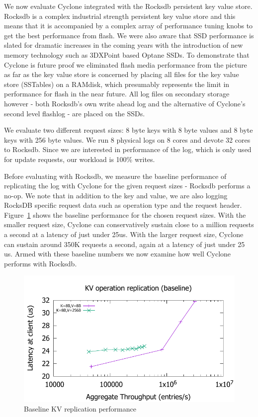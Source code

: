 \documentclass[pageno]{jpaper}
\begin{document}
We now evaluate Cyclone integrated with the Rocksdb persistent key value
store. Rocksdb is a complex industrial strength persistent key value store and
this means that it is accompanied by a complex array of performance tuning knobs
to get the best performance from flash. We were also aware that SSD performance
is slated for dramatic increases in the coming years with the introduction of
new memory technology such as 3DXPoint based Optane SSDs. To demonstrate that
Cyclone is future proof we eliminated flash media performance from the picture
as far as the key value store is concerned by placing all files for the key
value store (SSTables) on a RAMdisk, which presumably represents the limit in
performance for flash in the near future. All log files on secondary storage
however - both Rocksdb's own write ahead log and the alternative of Cyclone's
second level flashlog - are placed on the SSDs.

We evaluate two different request sizes: 8 byte keys with 8 byte values and 8
byte keys with 256 byte values. We run 8 physical logs on 8 cores and devote 32
cores to Rocksdb. Since we are interested in performance of the log, which is
only used for update requests, our workload is 100\% writes.

Before evaluating with Rocksdb, we measure the baseline performance of
replicating the log with Cyclone for the given request sizes - Rocksdb performs
a no-op. We note that in addition to the key and value, we are also logging
RocksDB specific request data such as operation type and the request header.
Figure~\ref{fig:kv_baseline} shows the baseline performance for the chosen
request sizes. With the smaller request size, Cyclone can conservatively sustain
close to a million requests a second at a latency of just under 25us. With the
larger request size, Cyclone can sustain around 350K requests a second, again at
a latency of just under 25 us. Armed with these baseline numbers we now examine
how well Cyclone performs with Rocksdb.

\begin{figure}
\includegraphics[scale=0.6]{results2/kv_baseline.pdf}
\caption{Baseline KV replication performance}
\label{fig:kv_baseline}
\end{figure}
\end{document}
